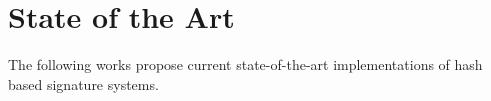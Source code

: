 \chapter{State of the Art}
\label{cha:stateOfTheArt}

The following works propose current state-of-the-art implementations of hash based signature systems.



